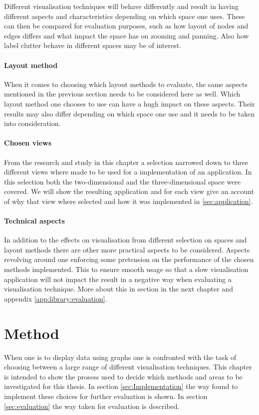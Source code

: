 \documentclass[a4paper,11pt]{kth-mag}
\begin{document}
Different visualisation techniques will behave differently and result in having different aspects and characteristics depending on which space one uses. These can then be compared for evaluation purposes,
such as how layout of nodes and edges differs and what impact the space has on zooming and panning. Also how label clutter behave in different spaces may be of interest.

\subsubsection{Layout method}
When it comes to choosing which layout methods to evaluate, the same aspects mentioned in the previous section needs to be considered here as well. Which layout method one chooses to use can have a hugh 
impact on these aspects. Their results may also differ depending on which space one use and it needs to be taken into consideration.
 
\subsubsection{Chosen views}
\label{chosen-views}
From the research and study in this chapter a selection narrowed down to three different views where made to be used for a implementation of an application. In this selection both the two-dimensional and the 
three-dimensional space were covered. We will show the resulting application and for each view give an account of why that view where selected and how it was implemented in \ref{sec:application}.

\subsubsection{Technical aspects}
In addition to the effects on visualisation from different selection on spaces and layout methods there are other more practical aspects to be considered. Aspects revolving around one enforcing some pretension
 on the performance of the chosen methods implemented. This to ensure smooth usage so that a slow visualisation application will not impact the result in a negative way when evaluating a visualisation technique.
 More about this in section in the next chapter and appendix \ref{app:library:evaluation}.
 
\chapter{Method}
\label{chap:three}
When one is to display data using graphs one is confronted with the task of choosing between a large range of different visualisation techniques.
This chapter is intended to show the prosess used to decide which methods and areas to be investigated for this thesis. In section \ref{sec:Implementation} 
the way found to implement these choices for further evaluation is shown. In section \ref{sec:evaluation} the way taken for evaluation is described.
\end{document}
